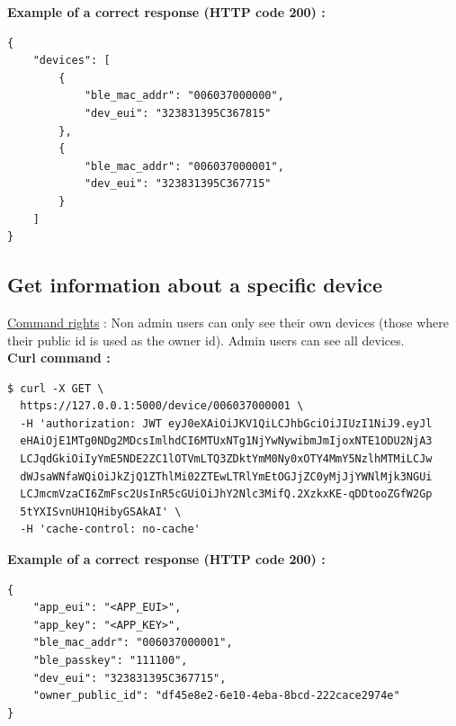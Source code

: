 \newpage
\textbf{Example of a correct response (HTTP code 200) : }

\begin{tcolorbox}[top=-3mm, bottom=-3mm, left=0mm, right=0mm, enhanced, breakable, colback=LightGray, colframe=DarkGray, colbacktitle=DarkGray]
\begin{verbatim}
{
    "devices": [
        {
            "ble_mac_addr": "006037000000",
            "dev_eui": "323831395C367815"
        },
        {
            "ble_mac_addr": "006037000001",
            "dev_eui": "323831395C367715"
        }
    ]
}
\end{verbatim}
\end{tcolorbox}

\subsection{Get information about a specific device}
\underline{Command rights} : Non admin users can only see their own devices (those where their public id is used as the owner id). Admin users can see all devices.\\

\textbf{Curl command :}

\begin{tcolorbox}[top=-3mm, bottom=-3mm, left=0mm, right=0mm, enhanced, breakable, colback=LightGray, colframe=DarkGray, colbacktitle=DarkGray]
\begin{verbatim}
$ curl -X GET \
  https://127.0.0.1:5000/device/006037000001 \
  -H 'authorization: JWT eyJ0eXAiOiJKV1QiLCJhbGciOiJIUzI1NiJ9.eyJl
  eHAiOjE1MTg0NDg2MDcsImlhdCI6MTUxNTg1NjYwNywibmJmIjoxNTE1ODU2NjA3
  LCJqdGkiOiIyYmE5NDE2ZC1lOTVmLTQ3ZDktYmM0Ny0xOTY4MmY5NzlhMTMiLCJw
  dWJsaWNfaWQiOiJkZjQ1ZThlMi02ZTEwLTRlYmEtOGJjZC0yMjJjYWNlMjk3NGUi
  LCJmcmVzaCI6ZmFsc2UsInR5cGUiOiJhY2Nlc3MifQ.2XzkxKE-qDDtooZGfW2Gp
  5tYXISvnUH1QHibyGSAkAI' \
  -H 'cache-control: no-cache' 
\end{verbatim}
\end{tcolorbox}

\textbf{Example of a correct response (HTTP code 200) : }

\begin{tcolorbox}[top=-3mm, bottom=-3mm, left=0mm, right=0mm, enhanced, breakable, colback=LightGray, colframe=DarkGray, colbacktitle=DarkGray]
\begin{verbatim}
{
    "app_eui": "<APP_EUI>",
    "app_key": "<APP_KEY>",
    "ble_mac_addr": "006037000001",
    "ble_passkey": "111100",
    "dev_eui": "323831395C367715",
    "owner_public_id": "df45e8e2-6e10-4eba-8bcd-222cace2974e"
}
\end{verbatim}
\end{tcolorbox}



